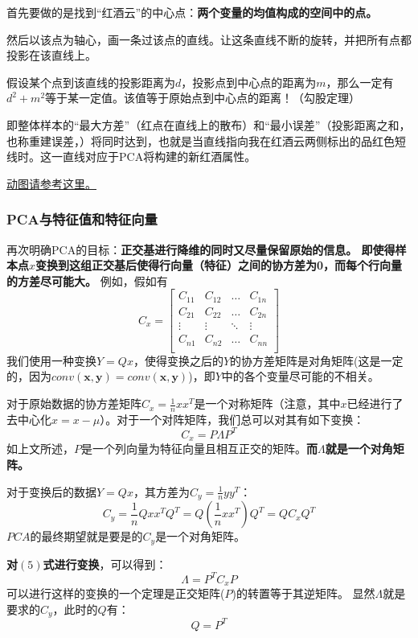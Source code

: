 \documentclass[12pt, letterpaper]{article}
\begin{document}
首先要做的是找到“红酒云”的中心点：\textbf{两个变量的均值构成的空间中的点。}

然后以该点为轴心，画一条过该点的直线。让这条直线不断的旋转，并把所有点都投影在该直线上。

假设某个点到该直线的投影距离为$d$，投影点到中心点的距离为$m$，那么一定有$d^2+m^2$等于某一定值。该值等于原始点到中心点的距离！（勾股定理）

即整体样本的“最大方差”（红点在直线上的散布）和“最小误差”（投影距离之和，也称重建误差，）将同时达到，也就是当直线指向我在红酒云两侧标出的品红色短线时。这一直线对应于PCA将构建的新红酒属性。


\href{https://www.zhihu.com/question/41120789/answer/474222214}{动图请参考这里。}
\subsubsection{PCA与特征值和特征向量}
再次明确PCA的目标：\textbf{正交基进行降维的同时又尽量保留原始的信息。
即使得样本点$x$变换到这组正交基后使得行向量（特征）之间的协方差为0，而每个行向量的方差尽可能大。}
例如，假如有
$$
C_x = 
\left[
\begin{matrix}
C_{11} & C_{12}& \ldots&C_{1n}\\
C_{21} & C_{22}& \ldots&C_{2n}\\
\vdots& \vdots&\ddots&\vdots \\
C_{n1}& C_{n2}&\ldots&C_{nn}\\
\end{matrix}
\right]
$$
我们使用一种变换$Y=Qx$，使得变换之后的$Y$的协方差矩阵是对角矩阵(这是一定的，因为$conv(\mathbf{x},\mathbf{y})=conv(\mathbf{x},\mathbf{y})$)，即$Y$中的各个变量尽可能的不相关。

对于原始数据的协方差矩阵$C_x=\frac{1}{n}xx^T$是一个对称矩阵（注意，其中$x$已经进行了去中心化$x=x-\mu$）。对于一个对阵矩阵，我们总可以对其有如下变换：
\begin{equation}
C_x = P\Lambda P^T
\end{equation}
如上文所述，$P$是一个列向量为特征向量且相互正交的矩阵。\textbf{而$\Lambda$就是一个对角矩阵。}

对于变换后的数据$Y=Qx$，其方差为$C_y=\frac{1}{n}yy^T$：
\begin{equation}
C_y=\frac{1}{n}Qxx^TQ^T=Q(\frac{1}{n}xx^T)Q^T=QC_xQ^T
\end{equation}
$PCA$的最终期望就是要是的$C_y$是一个对角矩阵。

\textbf{对$(5)$式进行变换}，可以得到：
\begin{equation}
\Lambda = P^TC_xP
\end{equation}
可以进行这样的变换的一个定理是正交矩阵($P$)的转置等于其逆矩阵。
显然$\Lambda$就是要求的$C_y$，此时的$Q$有：
\begin{equation}
Q=P^T
\end{equation}
\end{document}

